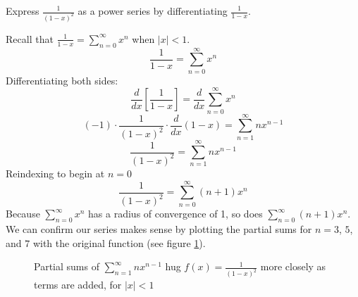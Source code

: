 \begin{Worked}
\begin{Problem}
Express $\frac{1}{(1-x)^2}$ as a power series by 
differentiating $\frac{1}{1-x}$. 
\end{Problem}
\begin{Solution}
Recall that $\frac{1}{1-x} = \sum_{n=0}^\infty x^n$ when 
$|x|<1$. 
$$\frac{1}{1-x} = \sum_{n=0}^\infty x^n$$
Differentiating both sides:
$$\frac{d}{dx} \left[ \frac{1}{1-x} \right] = \frac{d}{dx} \sum_{n=0}^\infty 
x^n$$
$$(-1) \cdot \frac{1}{(1-x)^2} \cdot \frac{d}{dx}(1-x) = \sum_{n=1}^\infty 
nx^{n-1}$$
$$\frac{1}{(1-x)^2} = \sum_{n=1}^\infty nx^{n-1}$$
Reindexing to begin at $n = 0$
$$\frac{1}{(1-x)^2} = \sum_{n=0}^\infty (n+1)x^n$$
Because $\sum_{n=0}^\infty x^n$ has a radius of convergence of 1, so does $\sum_{
n=0}^\infty (n+1)x^n$. We can confirm our series makes sense by plotting the 
partial sums for $n = 3$, $5$, and $7$ with the original function (see figure 
\ref{power1}).

\begin{figure}[H] 
\centering
    \caption{Partial sums of $\sum_{n=1}^\infty nx^{n-1}$ hug
    $f(x) = \frac{1}{(1-x)^2}$ more closely as terms are added, for $|x| < 1$}
    \label{power1}
\end{figure}
\end{Solution}
\end{Worked}

